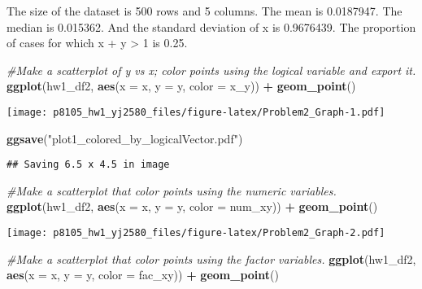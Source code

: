 \documentclass[]{article}
\newenvironment{Shaded}{\begin{snugshade}}{\end{snugshade}}
\newcommand{\CommentTok}[1]{\textcolor[rgb]{0.56,0.35,0.01}{\textit{#1}}}
\newcommand{\DataTypeTok}[1]{\textcolor[rgb]{0.13,0.29,0.53}{#1}}
\newcommand{\KeywordTok}[1]{\textcolor[rgb]{0.13,0.29,0.53}{\textbf{#1}}}
\newcommand{\NormalTok}[1]{#1}
\newcommand{\OperatorTok}[1]{\textcolor[rgb]{0.81,0.36,0.00}{\textbf{#1}}}
\newcommand{\StringTok}[1]{\textcolor[rgb]{0.31,0.60,0.02}{#1}}
\begin{document}
The size of the dataset is 500 rows and 5 columns. The mean is
0.0187947. The median is 0.015362. And the standard deviation of x is
0.9676439. The proportion of cases for which x + y \textgreater{} 1 is
0.25.

\begin{Shaded}
\begin{Highlighting}[]
\CommentTok{#Make a scatterplot of y vs x; color points using the logical variable and export it. }
\KeywordTok{ggplot}\NormalTok{(hw1_df2, }\KeywordTok{aes}\NormalTok{(}\DataTypeTok{x =}\NormalTok{ x, }\DataTypeTok{y =}\NormalTok{ y, }\DataTypeTok{color =}\NormalTok{ x_y)) }\OperatorTok{+}\StringTok{ }\KeywordTok{geom_point}\NormalTok{()}
\end{Highlighting}
\end{Shaded}

\texttt{[image: p8105\_hw1\_yj2580\_files/figure-latex/Problem2\_Graph-1.pdf]}

\begin{Shaded}
\begin{Highlighting}[]
\KeywordTok{ggsave}\NormalTok{(}\StringTok{"plot1_colored_by_logicalVector.pdf"}\NormalTok{)}
\end{Highlighting}
\end{Shaded}

\begin{verbatim}
## Saving 6.5 x 4.5 in image
\end{verbatim}

\begin{Shaded}
\begin{Highlighting}[]
\CommentTok{#Make a scatterplot that color points using the numeric variables.}
\KeywordTok{ggplot}\NormalTok{(hw1_df2, }\KeywordTok{aes}\NormalTok{(}\DataTypeTok{x =}\NormalTok{ x, }\DataTypeTok{y =}\NormalTok{ y, }\DataTypeTok{color =}\NormalTok{ num_xy)) }\OperatorTok{+}\StringTok{ }\KeywordTok{geom_point}\NormalTok{()}
\end{Highlighting}
\end{Shaded}

\texttt{[image: p8105\_hw1\_yj2580\_files/figure-latex/Problem2\_Graph-2.pdf]}

\begin{Shaded}
\begin{Highlighting}[]
\CommentTok{#Make a scatterplot that color points using the factor variables.}
\KeywordTok{ggplot}\NormalTok{(hw1_df2, }\KeywordTok{aes}\NormalTok{(}\DataTypeTok{x =}\NormalTok{ x, }\DataTypeTok{y =}\NormalTok{ y, }\DataTypeTok{color =}\NormalTok{ fac_xy)) }\OperatorTok{+}\StringTok{ }\KeywordTok{geom_point}\NormalTok{()}
\end{Highlighting}
\end{Shaded}
\end{document}
